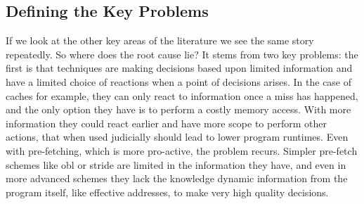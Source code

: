 \subsection{Defining the Key Problems}                                                                                                                                                                                                                                                                                                                                                                                                     
                                                                                                                                                                                                                                                                                                                                                                                                                                           
If we look at the other key areas of the literature we see the same story repeatedly. So where does the root cause lie? It stems from two key problems: the first is that techniques are making decisions based upon limited information and have a limited choice of reactions when a point of decisions arises. In the case of caches for example, they can only react to information once a miss has happened, and the only option they have is to perform a costly memory access. With more information they could react earlier and have more scope to perform other actions, that when used judicially should lead to lower program runtimes. Even with pre-fetching, which is more pro-active, the problem recurs. Simpler pre-fetch schemes like \gls{obl} or stride are limited in the information they have, and even in more advanced schemes they lack the knowledge dynamic information from the program itself, like effective addresses, to make very high quality decisions.


